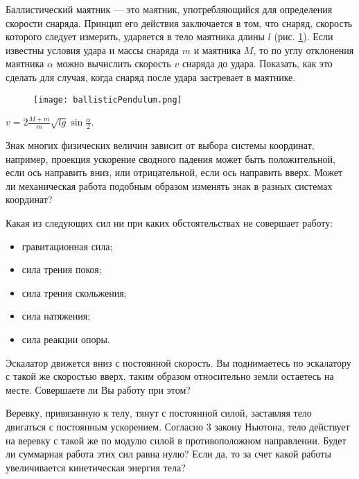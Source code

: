 \begin{ex} %
Баллистический маятник — это маятник, употребляющийся для определения скорости снаряда. Принцип его действия заключается в том, что снаряд, скорость которого следует измерить, ударяется в тело маятника длины $l$ (рис. \ref{ballisticPendulum}). Если известны условия удара и массы снаряда $m$ и маятника $M$, то по углу отклонения маятника $\alpha$ можно вычислить скорость $v$ снаряда до удара. Показать, как это сделать для случая, когда снаряд после удара застревает в маятнике.

\begin{figure}[h]
\centering
\texttt{[image: ballisticPendulum.png]}
\caption{}
\label{ballisticPendulum}
\end{figure}

\begin{ans}
$v = 2\frac{M+m}{m}\sqrt{lg}\sin \frac{\alpha}{2}$.
\end{ans}
\end{ex}

\qualProblems

\begin{ex}
Знак многих физических величин зависит от выбора системы координат, например, проекция ускорение сводного падения может быть положительной, если ось направить вниз, или отрицательной, если ось направить вверх. Может ли механическая работа подобным образом изменять знак в разных системах координат?
\end{ex}

\begin{ex}
Какая из следующих сил ни при каких обстоятельствах не совершает работу:
\begin{itemize}
\item гравитационная сила;
\item сила трения покоя;
\item сила трения скольжения;
\item сила натяжения;
\item сила реакции опоры.
\end{itemize}
\end{ex}

\begin{ex}
Эскалатор движется вниз с постоянной скорость. Вы поднимаетесь по эскалатору с такой же скоростью вверх, таким образом относительно земли остаетесь на месте. Совершаете ли Вы работу при этом?
\end{ex}

\begin{ex}
Веревку, привязанную к телу, тянут с постоянной силой, заставляя тело двигаться с постоянным ускорением. Согласно 3 закону Ньютона, тело действует на веревку с такой же по модулю силой в противоположном направлении. Будет ли суммарная работа этих сил равна нулю? Если да, то за счет какой работы увеличивается кинетическая энергия тела? 
\end{ex}

